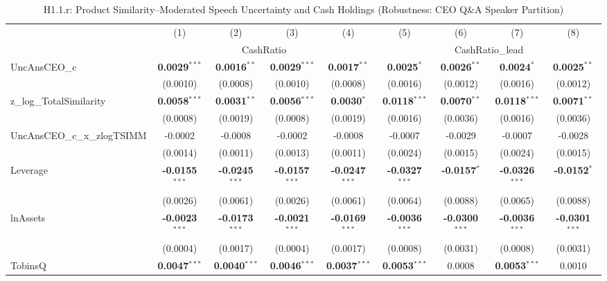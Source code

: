 \documentclass[11pt,a4paper]{article}
\begin{document}
\begin{table}[htbp]
\centering
\caption{H1.1.r: Product Similarity--Moderated Speech Uncertainty and Cash Holdings (Robustness: CEO Q\&A Speaker Partition)}
\label{tab:h1_1_robust}
\scriptsize
\begin{tabular}{lcccccccc}
\toprule
 & (1) & (2) & (3) & (4) & (5) & (6) & (7) & (8) \\
 & \multicolumn{4}{c}{CashRatio} & \multicolumn{4}{c}{CashRatio\_lead} \\
\cmidrule(lr){2-5} \cmidrule(lr){6-9}
\midrule
UncAnsCEO\_c & \textbf{0.0029}$^{***}$ & \textbf{0.0016}$^{**}$ & \textbf{0.0029}$^{***}$ & \textbf{0.0017}$^{**}$ & \textbf{0.0025}$^{*}$ & \textbf{0.0026}$^{**}$ & \textbf{0.0024}$^{*}$ & \textbf{0.0025}$^{**}$ \\
 & (0.0010) & (0.0008) & (0.0010) & (0.0008) & (0.0016) & (0.0012) & (0.0016) & (0.0012) \\
z\_log\_TotalSimilarity & \textbf{0.0058}$^{***}$ & \textbf{0.0031}$^{**}$ & \textbf{0.0056}$^{***}$ & \textbf{0.0030}$^{*}$ & \textbf{0.0118}$^{***}$ & \textbf{0.0070}$^{**}$ & \textbf{0.0118}$^{***}$ & \textbf{0.0071}$^{**}$ \\
 & (0.0008) & (0.0019) & (0.0008) & (0.0019) & (0.0016) & (0.0036) & (0.0016) & (0.0036) \\
UncAnsCEO\_c\_x\_zlogTSIMM & -0.0002 & -0.0008 & -0.0002 & -0.0008 & -0.0007 & -0.0029 & -0.0007 & -0.0028 \\
 & (0.0014) & (0.0011) & (0.0013) & (0.0011) & (0.0024) & (0.0015) & (0.0024) & (0.0015) \\
\midrule
Leverage & \textbf{-0.0155}$^{***}$ & \textbf{-0.0245}$^{***}$ & \textbf{-0.0157}$^{***}$ & \textbf{-0.0247}$^{***}$ & \textbf{-0.0327}$^{***}$ & \textbf{-0.0157}$^{*}$ & \textbf{-0.0326}$^{***}$ & \textbf{-0.0152}$^{*}$ \\
 & (0.0026) & (0.0061) & (0.0026) & (0.0061) & (0.0064) & (0.0088) & (0.0065) & (0.0088) \\
lnAssets & \textbf{-0.0023}$^{***}$ & \textbf{-0.0173}$^{***}$ & \textbf{-0.0021}$^{***}$ & \textbf{-0.0169}$^{***}$ & \textbf{-0.0036}$^{***}$ & \textbf{-0.0300}$^{***}$ & \textbf{-0.0036}$^{***}$ & \textbf{-0.0301}$^{***}$ \\
 & (0.0004) & (0.0017) & (0.0004) & (0.0017) & (0.0008) & (0.0031) & (0.0008) & (0.0031) \\
TobinsQ & \textbf{0.0047}$^{***}$ & \textbf{0.0040}$^{***}$ & \textbf{0.0046}$^{***}$ & \textbf{0.0037}$^{***}$ & \textbf{0.0053}$^{***}$ & 0.0008 & \textbf{0.0053}$^{***}$ & 0.0010 \\

\end{tabular}
\end{table}
\end{document}
